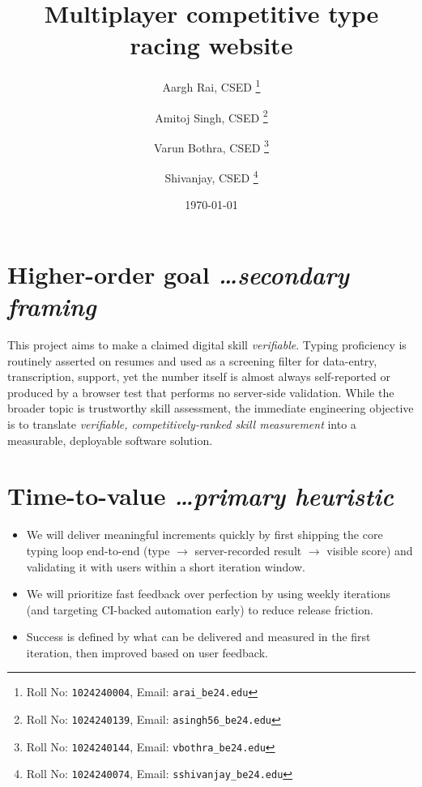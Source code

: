 \documentclass[11pt,a4paper]{article}
\title{Multiplayer competitive type racing website}
\author{
  Aargh Rai, CSED%
  \thanks{Roll No: \texttt{1024240004}, %
    Email: \texttt{arai\_be24\@thapar.edu}}
  \and 
  Amitoj Singh, CSED%
  \thanks{Roll No: \texttt{1024240139}, %
    Email: \texttt{asingh56\_be24\@thapar.edu}}
  \and 
  Varun Bothra, CSED%
  \thanks{Roll No: \texttt{1024240144}, %
    Email: \texttt{vbothra\_be24\@thapar.edu}}
  \and 
  Shivanjay, CSED%
  \thanks{Roll No: \texttt{1024240074}, %
    Email: \texttt{sshivanjay\_be24\@thapar.edu}}
}
\date{\today}
\newcommand{\BvrHint}[1]{%
  {\normalfont\normalsize\itshape\hfill #1}}
\begin{document}
\maketitle

\section{Higher-order goal%
  \BvrHint{\ldots secondary framing}}
This project aims to make a claimed digital skill
\emph{verifiable}. Typing proficiency is routinely asserted on
resumes and used as a screening filter for data-entry,
transcription, support, yet the number itself is
almost always self-reported or produced by a browser test that
performs no server-side validation. While the broader topic is
trustworthy skill assessment, the immediate engineering objective
is to translate \emph{verifiable, competitively-ranked skill
  measurement} into a measurable, deployable software solution.

\section{Time-to-value %
\BvrHint{\ldots primary heuristic}}
\begin{itemize}[leftmargin=0.7cm]
    \item We will deliver meaningful increments quickly by first shipping the core typing loop end-to-end (type $\rightarrow$ server-recorded result $\rightarrow$ visible score) and validating it with users within a short iteration window.
    \item We will prioritize fast feedback over perfection by using weekly iterations (and targeting CI-backed automation early) to reduce release friction.
    \item Success is defined by what can be delivered and measured in the first iteration, then improved based on user feedback.
\end{itemize}

\end{document}
